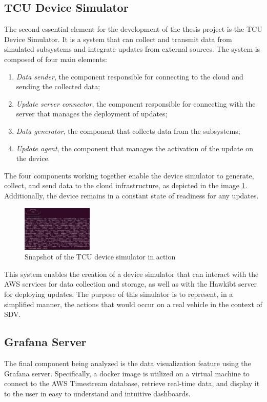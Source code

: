 \documentclass[10pt,a4paper,roman, twocolumn]{article}
\begin{document}
\subsection{TCU Device Simulator}
The second essential element for the development of the thesis project is the TCU Device Simulator. It is a system that can collect and transmit data from simulated subsystems and integrate updates from external sources. The system is composed of four main elements:
\begin{enumerate}
	\setlength\itemsep{-0.3em}
	\item \textit{Data sender}, the component responsible for connecting to the cloud and sending the collected data;
	\item \textit{Update server connector}, the component responsible for connecting with the server that manages the deployment of updates;
	\item \textit{Data generator}, the component that collects data from the subsystems;
	\item \textit{Update agent}, the component that manages the activation of the update on the device.
\end{enumerate}

The four components working together enable the device simulator to generate, collect, and send data to the cloud infrastructure, as depicted in the image \ref{fig:TCUSimulatorP}. Additionally, the device remains in a constant state of readiness for any updates.
\begin{figure} [tbh]
	\centerline{\includegraphics[width=0.3\textwidth]{images/TCUSimulatorP.png}}
	\caption{Snapshot of the TCU device simulator in action}
	\label{fig:TCUSimulatorP}
\end{figure}

This system enables the creation of a device simulator that can interact with the AWS services for data collection and storage, as well as with the Hawkibt server for deploying updates. The purpose of this simulator is to represent, in a simplified manner, the actions that would occur on a real vehicle in the context of SDV.

\subsection{Grafana Server}
The final component being analyzed is the data visualization feature using the Grafana server. Specifically, a docker image is utilized on a virtual machine to connect to the AWS Timestream database, retrieve real-time data, and display it to the user in easy to understand and intuitive dashboards.
\end{document}
